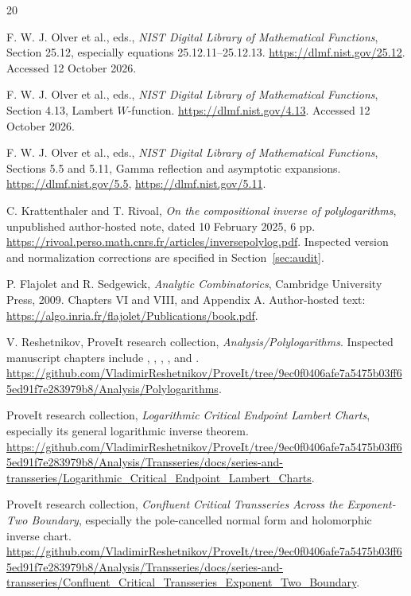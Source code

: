 \documentclass[11pt,a4paper]{article}
\numberwithin{equation}{section}
\theoremstyle{definition}
\theoremstyle{remark}
\begin{document}
\begingroup
\small
\begin{thebibliography}{20}

F. W. J. Olver et al., eds.,
\emph{NIST Digital Library of Mathematical Functions},
Section 25.12, especially equations 25.12.11--25.12.13.
\url{https://dlmf.nist.gov/25.12}.
Accessed 12 October 2026.

F. W. J. Olver et al., eds.,
\emph{NIST Digital Library of Mathematical Functions},
Section 4.13, Lambert \(W\)-function.
\url{https://dlmf.nist.gov/4.13}.
Accessed 12 October 2026.

F. W. J. Olver et al., eds.,
\emph{NIST Digital Library of Mathematical Functions},
Sections 5.5 and 5.11, Gamma reflection and asymptotic expansions.
\url{https://dlmf.nist.gov/5.5},
\url{https://dlmf.nist.gov/5.11}.

C. Krattenthaler and T. Rivoal,
\emph{On the compositional inverse of polylogarithms},
unpublished author-hosted note, dated 10 February 2025, 6 pp.
\url{https://rivoal.perso.math.cnrs.fr/articles/inversepolylog.pdf}.
Inspected version and normalization corrections are specified in
Section~\ref{sec:audit}.

P. Flajolet and R. Sedgewick,
\emph{Analytic Combinatorics},
Cambridge University Press, 2009.
Chapters VI and VIII, and Appendix A.
Author-hosted text:
\url{https://algo.inria.fr/flajolet/Publications/book.pdf}.

V. Reshetnikov, ProveIt research collection,
\emph{Analysis/Polylogarithms}.
Inspected manuscript chapters include
,
,
,
, and
.
\url{https://github.com/VladimirReshetnikov/ProveIt/tree/9ec0f0406afe7a5475b03ff65ed91f7e283979b8/Analysis/Polylogarithms}.

ProveIt research collection,
\emph{Logarithmic Critical Endpoint Lambert Charts},
especially its general logarithmic inverse theorem.
\url{https://github.com/VladimirReshetnikov/ProveIt/tree/9ec0f0406afe7a5475b03ff65ed91f7e283979b8/Analysis/Transseries/docs/series-and-transseries/Logarithmic_Critical_Endpoint_Lambert_Charts}.

ProveIt research collection,
\emph{Confluent Critical Transseries Across the Exponent-Two Boundary},
especially the pole-cancelled normal form and holomorphic inverse chart.
\url{https://github.com/VladimirReshetnikov/ProveIt/tree/9ec0f0406afe7a5475b03ff65ed91f7e283979b8/Analysis/Transseries/docs/series-and-transseries/Confluent_Critical_Transseries_Exponent_Two_Boundary}.


\end{thebibliography}
\end{document}
